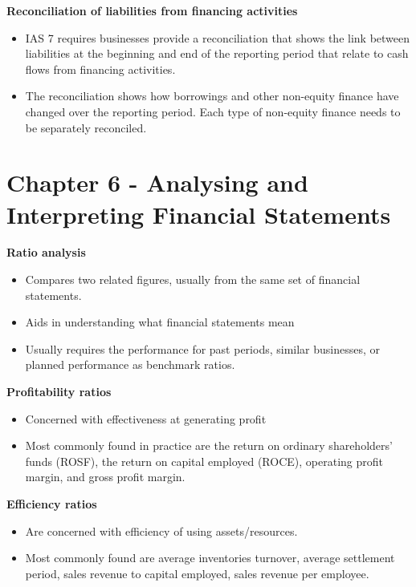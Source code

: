 \documentclass{report}
\begin{document}
\textbf{Reconciliation of liabilities from financing activities}
\begin{itemize}
    \item IAS 7 requires businesses provide a reconciliation that shows the link between liabilities at the beginning and end of the reporting period that relate to cash flows from financing activities.
    \item The reconciliation shows how borrowings and other non-equity finance have changed over the reporting period. Each type of non-equity finance needs to be separately reconciled.
\end{itemize}

\section{Chapter 6 - Analysing and Interpreting Financial Statements}

\textbf{Ratio analysis}
\begin{itemize}
    \item Compares two related figures, usually from the same set of financial statements.
    \item Aids in understanding what financial statements mean
    \item Usually requires the performance for past periods, similar businesses, or planned performance as benchmark ratios.\\
\end{itemize}

\textbf{Profitability ratios}
\begin{itemize}
    \item Concerned with effectiveness at generating profit
    \item Most commonly found in practice are the return on ordinary shareholders' funds (ROSF), the return on capital employed (ROCE), operating profit margin, and gross profit margin.\\
\end{itemize}

\textbf{Efficiency ratios}
\begin{itemize}
    \item Are concerned with efficiency of using assets/resources.
    \item Most commonly found are average inventories turnover, average settlement period, sales revenue to capital employed, sales revenue per employee.\\
\end{itemize}
\end{document}
